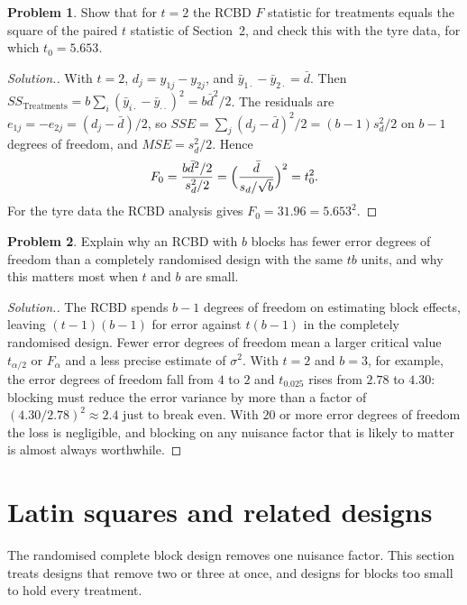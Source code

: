 \documentclass[11pt,a4paper]{article}
\numberwithin{equation}{section}
\theoremstyle{definition}
\newtheorem{problemx}{Problem}[subsection]
\newenvironment{problem}{\begin{problemx}}{\end{problemx}}
\newenvironment{solution}
  {\renewcommand{\qedsymbol}{}\begin{proof}[\textit{Solution}.]}
  {\end{proof}}
\begin{document}
\begin{problem}
Show that for $t = 2$ the RCBD $F$ statistic for treatments equals the square of the paired $t$ statistic of Section~2, and check this with the tyre
data, for which $t_0 = 5.653$.
\end{problem}

\begin{solution}
With $t = 2$, $d_j = y_{1j} - y_{2j}$, and $\bar y_{1\cdot} - \bar y_{2\cdot} = \bar d$. Then $SS_{\mathrm{Treatments}} = b\sum_i(\bar y_{i\cdot} - \bar y_{\cdot\cdot})^2 = b\bar d^2/2$. The residuals are
$e_{1j} = -e_{2j} = (d_j - \bar d)/2$, so $SSE = \sum_j(d_j - \bar d)^2/2 = (b - 1)s_d^2/2$ on $b - 1$ degrees of freedom, and $MSE = s_d^2/2$. Hence
\[
F_0 = \frac{b\bar d^2/2}{s_d^2/2} = \Bigl(\frac{\bar d}{s_d/\sqrt b}\Bigr)^2 = t_0^2 .
\]
For the tyre data the RCBD analysis gives $F_0 = 31.96 = 5.653^2$.
\end{solution}

\begin{problem}
Explain why an RCBD with $b$ blocks has fewer error degrees of freedom than a completely randomised design with the same $tb$ units, and why
this matters most when $t$ and $b$ are small.
\end{problem}

\begin{solution}
The RCBD spends $b - 1$ degrees of freedom on estimating block effects, leaving $(t - 1)(b - 1)$ for error against $t(b - 1)$ in the completely randomised
design. Fewer error degrees of freedom mean a larger critical value $t_{\alpha/2}$ or $F_\alpha$ and a less precise estimate of $\sigma^2$. With $t = 2$ and $b = 3$, for
example, the error degrees of freedom fall from $4$ to $2$ and $t_{0.025}$ rises from $2.78$ to $4.30$: blocking must reduce the error variance by more than a
factor of $(4.30/2.78)^2 \approx 2.4$ just to break even. With $20$ or more error degrees of freedom the loss is negligible, and blocking on any nuisance factor
that is likely to matter is almost always worthwhile.
\end{solution}

\section{Latin squares and related designs}
The randomised complete block design removes one nuisance factor. This section treats designs that remove two or three at once, and
designs for blocks too small to hold every treatment.
\end{document}
